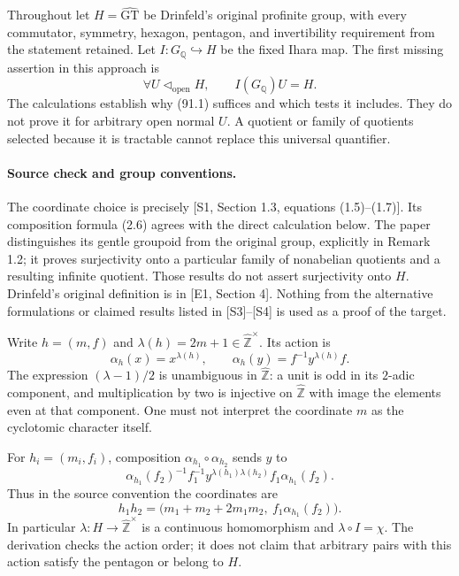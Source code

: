 \documentclass[11pt]{article}
\begin{document}
Throughout let $H=\widehat{\mathrm{GT}}$ be Drinfeld's original profinite group, with every commutator, symmetry, hexagon, pentagon, and invertibility requirement from the statement retained. Let $I:G_{\mathbb Q}\hookrightarrow H$ be the fixed Ihara map. The first missing assertion in this approach is
\[
 \forall U\triangleleft_{\mathrm{open}}H,\qquad
       I(G_{\mathbb Q})U=H.
 \tag{91.1}
\]
The calculations establish why (91.1) suffices and which tests it includes. They do not prove it for arbitrary open normal $U$. A quotient or family of quotients selected because it is tractable cannot replace this universal quantifier.

\paragraph{Source check and group conventions.}
The coordinate choice is precisely [S1, Section 1.3, equations (1.5)--(1.7)]. Its composition formula (2.6) agrees with the direct calculation below. The paper distinguishes its gentle groupoid from the original group, explicitly in Remark 1.2; it proves surjectivity onto a particular family of nonabelian quotients and a resulting infinite quotient. Those results do not assert surjectivity onto $H$. Drinfeld's original definition is in [E1, Section 4]. Nothing from the alternative formulations or claimed results listed in [S3]--[S4] is used as a proof of the target.

Write $h=(m,f)$ and $\lambda(h)=2m+1\in\widehat{\mathbb Z}^{\times}$. Its action is
\[
 \alpha_h(x)=x^{\lambda(h)},\qquad
 \alpha_h(y)=f^{-1}y^{\lambda(h)}f.
\]
The expression $(\lambda-1)/2$ is unambiguous in $\widehat{\mathbb Z}$: a unit is odd in its $2$-adic component, and multiplication by two is injective on $\widehat{\mathbb Z}$ with image the elements even at that component. One must not interpret the coordinate $m$ as the cyclotomic character itself.

For $h_i=(m_i,f_i)$, composition $\alpha_{h_1}\circ\alpha_{h_2}$ sends $y$ to
\[
 \alpha_{h_1}(f_2)^{-1}f_1^{-1}
       y^{\lambda(h_1)\lambda(h_2)}
       f_1\alpha_{h_1}(f_2).
\]
Thus in the source convention the coordinates are
\[
 h_1h_2=
 \bigl(m_1+m_2+2m_1m_2,\ f_1\alpha_{h_1}(f_2)\bigr).
 \tag{91.2}
\]
In particular $\lambda:H\to\widehat{\mathbb Z}^{\times}$ is a continuous homomorphism and $\lambda\circ I=\chi$. The derivation checks the action order; it does not claim that arbitrary pairs with this action satisfy the pentagon or belong to $H$.
\end{document}
